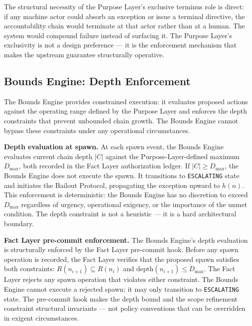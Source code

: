 \medskip
The structural necessity of the Purpose Layer's exclusive terminus role is direct: if any machine actor could absorb an exception or issue a terminal directive, the accountability chain would terminate at that actor rather than at a human. The system would compound failure instead of surfacing it. The Purpose Layer's exclusivity is not a design preference — it is the enforcement mechanism that makes the upstream guarantee structurally operative.

\subsection{Bounds Engine: Depth Enforcement}
\label{sec:rs-bounds-depth}

The Bounds Engine provides constrained execution: it evaluates proposed actions against the operating range defined by the Purpose Layer and enforces the depth constraints that prevent unbounded chain growth. The Bounds Engine cannot bypass these constraints under any operational circumstances.

\medskip
\noindent\textbf{Depth evaluation at spawn.} At each spawn event, the Bounds Engine evaluates current chain depth $|C|$ against the Purpose-Layer-defined maximum $D_{\text{max}}$, both recorded in the Fact Layer authorization ledger. If $|C| \geq D_{\text{max}}$, the Bounds Engine does not execute the spawn. It transitions to \texttt{ESCALATING} state and initiates the Bailout Protocol, propagating the exception upward to $h(n)$. This enforcement is deterministic: the Bounds Engine has no discretion to exceed $D_{\text{max}}$ regardless of urgency, operational exigency, or the importance of the unmet condition. The depth constraint is not a heuristic — it is a hard architectural boundary.

\medskip
\noindent\textbf{Fact Layer pre-commit enforcement.} The Bounds Engine's depth evaluation is structurally enforced by the Fact Layer pre-commit hook. Before any spawn operation is recorded, the Fact Layer verifies that the proposed spawn satisfies both constraints: $R(n_{i+1}) \subseteq R(n_i)$ and $\text{depth}(n_{i+1}) \leq D_{\text{max}}$. The Fact Layer rejects any spawn operation that violates either constraint. The Bounds Engine cannot execute a rejected spawn; it may only transition to \texttt{ESCALATING} state. The pre-commit hook makes the depth bound and the scope refinement constraint structural invariants — not policy conventions that can be overridden in exigent circumstances.

